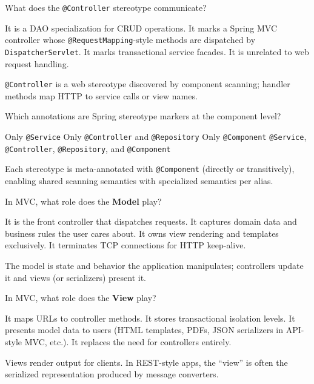 \question[4]
What does the \texttt{@Controller} stereotype communicate?
\begin{choices}
  \choice It is a DAO specialization for CRUD operations.
  \CorrectChoice It marks a Spring MVC controller whose \texttt{@RequestMapping}-style methods are dispatched by \texttt{DispatcherServlet}.
  \choice It marks transactional service facades.
  \choice It is unrelated to web request handling.
\end{choices}
\begin{solution}
  \texttt{@Controller} is a web stereotype discovered by component scanning; handler methods map HTTP to service calls or view names.
\end{solution}

\question[4]
Which annotations are Spring stereotype markers at the component level?
\begin{choices}
  \choice Only \texttt{@Service}
  \choice Only \texttt{@Controller} and \texttt{@Repository}
  \choice Only \texttt{@Component}
  \CorrectChoice \texttt{@Service}, \texttt{@Controller}, \texttt{@Repository}, and \texttt{@Component}
\end{choices}
\begin{solution}
  Each stereotype is meta-annotated with \texttt{@Component} (directly or transitively), enabling shared scanning semantics with specialized semantics per alias.
\end{solution}

\question[4]
In MVC, what role does the \textbf{Model} play?
\begin{choices}
  \choice It is the front controller that dispatches requests.
  \CorrectChoice It captures domain data and business rules the user cares about.
  \choice It owns view rendering and templates exclusively.
  \choice It terminates TCP connections for HTTP keep-alive.
\end{choices}
\begin{solution}
  The model is state and behavior the application manipulates; controllers update it and views (or serializers) present it.
\end{solution}

\question[4]
In MVC, what role does the \textbf{View} play?
\begin{choices}
  \choice It maps URLs to controller methods.
  \choice It stores transactional isolation levels.
  \CorrectChoice It presents model data to users (HTML templates, PDFs, JSON serializers in API-style MVC, etc.).
  \choice It replaces the need for controllers entirely.
\end{choices}
\begin{solution}
  Views render output for clients. In REST-style apps, the ``view'' is often the serialized representation produced by message converters.
\end{solution}


